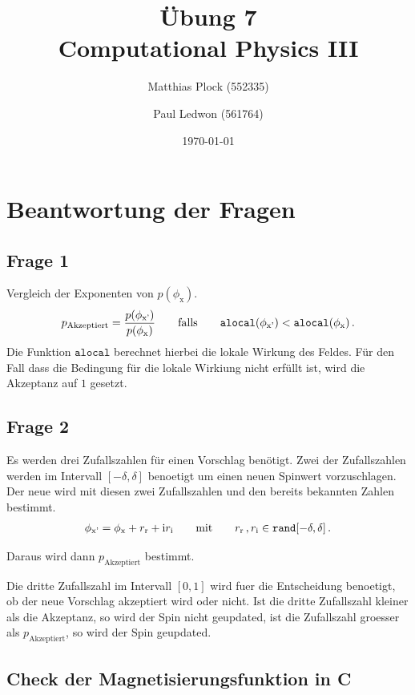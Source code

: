 \documentclass[10pt,a4paper]{article}
\title{Übung 7 \\Computational Physics III}
\author{Matthias Plock (552335) \and Paul Ledwon (561764)} %
\date{\today}
\begin{document}
\maketitle
\tableofcontents

\pagestyle{myheadings}                  %

\section{Beantwortung der Fragen}

\subsection{Frage 1}
Vergleich der Exponenten von $p(\phi_{\text{x}})$.
\begin{align*}
  p_{\text{Akzeptiert}} = \frac{p(\phi_{\text{x'}})}{p(\phi_{\text{x}})} \qquad \text{falls} \qquad \text{\texttt{alocal}}(\phi_{\text{x'}}) < \text{\texttt{alocal}}(\phi_{\text{x}})\,.
\end{align*}
Die Funktion ${\texttt{alocal}}$ berechnet hierbei die lokale Wirkung des Feldes.
Für den Fall  dass die Bedingung für die lokale Wirkiung nicht erfüllt ist, wird die Akzeptanz auf $1$ gesetzt.

\subsection{Frage 2}
Es werden drei Zufallszahlen f\"ur einen Vorschlag ben\"otigt. Zwei der Zufallszahlen werden im Intervall
$[-\delta,\delta]$ benoetigt um einen neuen Spinwert vorzuschlagen. Der neue wird mit diesen  zwei Zufallszahlen und den bereits bekannten Zahlen bestimmt.
\begin{align*}
  \phi_{\text{x'}} = \phi_{\text{x}} +  r_{\text{r}} + \mathrm{i} r_{\text{i}}
  \qquad \text{mit} \qquad r_{\text{r}}\,, r_{\text{i}} \in \text{\texttt{rand}}[-\delta, \delta]\,.
\end{align*}

Daraus wird dann $p_{\text{Akzeptiert}}$ bestimmt.

Die dritte Zufallszahl im Intervall $[0,1]$ wird fuer die Entscheidung benoetigt, ob der neue Vorschlag akzeptiert wird oder nicht. Ist die dritte Zufallszahl kleiner als die Akzeptanz, so wird der Spin nicht geupdated, ist die Zufallszahl groesser als $p_{\text{Akzeptiert}}$, so wird der Spin geupdated.

\subsection{Check der Magnetisierungsfunktion in C}
\end{document}
